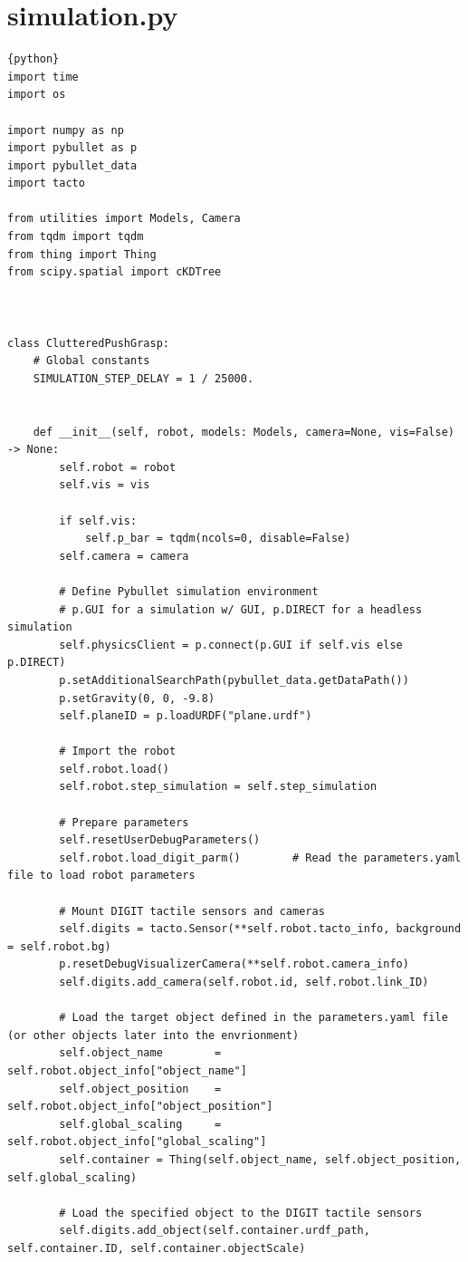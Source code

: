 \documentclass[11pt, a4paper]{report}
\begin{document}
\section{simulation.py}
\begin{lstlisting}{python}
import time
import os

import numpy as np
import pybullet as p
import pybullet_data
import tacto

from utilities import Models, Camera
from tqdm import tqdm
from thing import Thing
from scipy.spatial import cKDTree



class ClutteredPushGrasp:
    # Global constants
    SIMULATION_STEP_DELAY = 1 / 25000.


    def __init__(self, robot, models: Models, camera=None, vis=False) -> None:
        self.robot = robot
        self.vis = vis

        if self.vis:
            self.p_bar = tqdm(ncols=0, disable=False)
        self.camera = camera

        # Define Pybullet simulation environment
        # p.GUI for a simulation w/ GUI, p.DIRECT for a headless simulation
        self.physicsClient = p.connect(p.GUI if self.vis else p.DIRECT)
        p.setAdditionalSearchPath(pybullet_data.getDataPath())
        p.setGravity(0, 0, -9.8)
        self.planeID = p.loadURDF("plane.urdf")

        # Import the robot
        self.robot.load()
        self.robot.step_simulation = self.step_simulation

        # Prepare parameters
        self.resetUserDebugParameters()
        self.robot.load_digit_parm()        # Read the parameters.yaml file to load robot parameters

        # Mount DIGIT tactile sensors and cameras
        self.digits = tacto.Sensor(**self.robot.tacto_info, background = self.robot.bg)
        p.resetDebugVisualizerCamera(**self.robot.camera_info)
        self.digits.add_camera(self.robot.id, self.robot.link_ID)

        # Load the target object defined in the parameters.yaml file (or other objects later into the envrionment)
        self.object_name        = self.robot.object_info["object_name"]
        self.object_position    = self.robot.object_info["object_position"]
        self.global_scaling     = self.robot.object_info["global_scaling"]
        self.container = Thing(self.object_name, self.object_position, self.global_scaling)

        # Load the specified object to the DIGIT tactile sensors
        self.digits.add_object(self.container.urdf_path, self.container.ID, self.container.objectScale)


\end{lstlisting}
\end{document}
